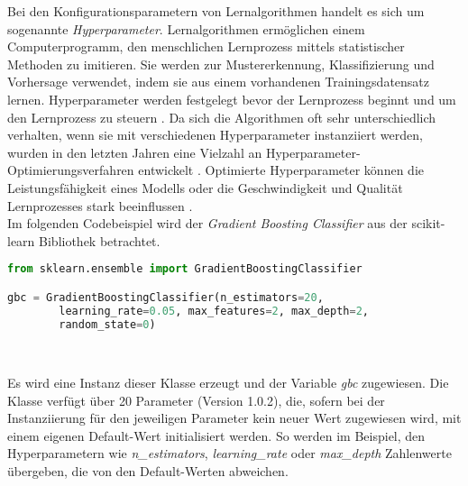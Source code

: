 \documentclass[german,bachelor]{swsLeipzig}
\begin{document}
Bei den Konfigurationsparametern von Lernalgorithmen handelt es sich um sogenannte \textit{Hyperparameter}.
Lernalgorithmen ermöglichen einem Computerprogramm, den menschlichen Lernprozess mittels statistischer Methoden zu imitieren.
Sie werden zur Mustererkennung, Klassifizierung und Vorhersage verwendet, indem sie aus einem vorhandenen Trainingsdatensatz
lernen.
Hyperparameter werden festgelegt bevor der Lernprozess beginnt und um den Lernprozess zu steuern \cite[]{hype}.
Da sich die Algorithmen oft sehr unterschiedlich verhalten, wenn sie mit verschiedenen Hyperparameter instanziiert werden,
wurden in den letzten Jahren eine Vielzahl an Hyperparameter-Optimierungsverfahren entwickelt \cite[]{pmlr-v32-hutter14}.
Optimierte Hyperparameter können die Leistungsfähigkeit eines Modells oder die Geschwindigkeit und Qualität Lernprozesses stark beeinflussen \cite[]{hype}.\\

Im folgenden Codebeispiel wird der \textit{Gradient Boosting Classifier} aus der scikit-learn Bibliothek betrachtet.\\

\noindent\begin{minipage}{\linewidth}
\begin{lstlisting}[language=Python, frame=single, label=gbccode, basicstyle=\small, caption={Nutzung der GradientBoostingClassifier-Klasse aus scikit-learn},captionpos=b]
from sklearn.ensemble import GradientBoostingClassifier

gbc = GradientBoostingClassifier(n_estimators=20,
        learning_rate=0.05, max_features=2, max_depth=2,
        random_state=0)
\end{lstlisting}
\end{minipage}
\

Es wird eine Instanz dieser Klasse erzeugt und der Variable \textit{gbc} zugewiesen.
Die Klasse verfügt über 20 Parameter (Version 1.0.2), die, sofern bei der Instanziierung für den jeweiligen Parameter
kein neuer Wert zugewiesen wird, mit einem eigenen Default-Wert initialisiert werden.
So werden im Beispiel, den Hyperparametern wie \textit{n\_estimators}, \textit{learning\_rate} oder \textit{max\_depth}
Zahlenwerte übergeben, die von den Default-Werten abweichen.\\
\end{document}
